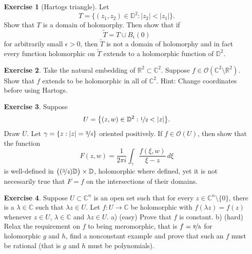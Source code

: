 \documentclass[12pt,openany]{book}
\newcommand{\sabs}[1]{\lvert {#1} \rvert}
\newcommand{\C}{{\mathbb{C}}}
\newcommand{\R}{{\mathbb{R}}}
\newcommand{\D}{{\mathbb{D}}}
\newcommand{\sO}{{\mathcal{O}}}
\newcommand{\myindex}[1]{#1\index{#1}}
\theoremstyle{plain}
\theoremstyle{remark}
\theoremstyle{definition}
\newenvironment{exbox}{%
    \def\FrameCommand{\vrule width 1pt \relax\hspace {10pt}}%
    \MakeFramed {\advance \hsize -\width \FrameRestore }%
}{%
    \endMakeFramed
}
\theoremstyle{exercise}
\newtheorem{exercise}{Exercise}[section]
\theoremstyle{example}
\begin{document}
\begin{exbox}
\begin{exercise}[\myindex{Hartogs triangle}]\label{exercise:hartogstriangle}
Let
\begin{equation*}
T = \bigl\{ (z_1,z_2) \in \D^2 : \sabs{z_2} < \sabs{z_1} \bigr\} .
\end{equation*}
Show that $T$ is a domain of holomorphy.  Then show that if
\begin{equation*}
\widetilde{T} = T \cup B_{\epsilon}(0)
\end{equation*}
for arbitrarily small $\epsilon > 0$, then $\widetilde{T}$ is not a domain
of holomorphy and in fact every function holomorphic on $\widetilde{T}$
extends to a holomorphic function of $\D^2$.
\end{exercise}

\begin{exercise} \label{exercise:C2minusR2}
Take the natural embedding of $\R^2 \subset \C^2$.  Suppose 
$f \in \sO(\C^2 \setminus \R^2)$.  Show that $f$ extends to be holomorphic
in all of $\C^2$.  Hint: Change coordinates before using Hartogs.
\end{exercise}

\begin{exercise}
Suppose 
\begin{equation*}
U = \bigl\{ (z,w) \in \D^2 : \nicefrac{1}{2} < \sabs{z} \bigr\} .
\end{equation*}
Draw $U$.  
Let $\gamma = \{ z : \sabs{z} = \nicefrac{3}{4} \}$ oriented positively.
If $f \in \sO(U)$, then show that the function
\begin{equation*}
F(z,w)
=
\frac{1}{2\pi i}
\int_\gamma \frac{f(\xi,w)}{\xi-z} \, d\xi
\end{equation*}
is well-defined in
$\bigl( (\nicefrac{3}{4}) \D \bigr) \times \D$, holomorphic where defined, yet
it is not necessarily true that $F = f$ on the intersections of their
domains.
\end{exercise}

\begin{exercise}
Suppose $U \subset \C^n$ is an open set such that for every
$z \in \C^n \setminus \{ 0 \}$, there is a $\lambda \in \C$ such that
$\lambda z \in U$.  Let $f \colon U \to \C$ be holomorphic with
$f(\lambda z) = f(z)$ whenever $z \in U$, $\lambda \in \C$ and $\lambda z
\in U$.  a) (easy) Prove that $f$ is constant.  b) (hard) Relax the requirement on
$f$ to being meromorphic, that is $f = \nicefrac{g}{h}$
for holomorphic $g$ and $h$,
find a nonconstant example and prove that such an $f$ must be rational (that
is $g$ and $h$ must be polynomials).
\end{exercise}
\end{exbox}
\end{document}

